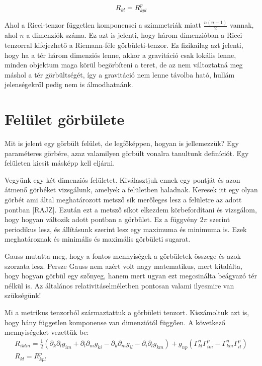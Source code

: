 \documentclass[a4paper,12pt]{article}
\begin{document}
\begin{equation*}
    R_{kl} = R_{kpl}^{p}
\end{equation*}
\par Ahol a Ricci-tenzor független komponensei a szimmetriák miatt $\frac{n(n+1)}{2}$ vannak, ahol $n$ a dimenziók száma. Ez azt is jelenti, hogy három dimenzióban a Ricci-tenzorral kifejezhető a Riemann-féle görbületi-tenzor. Ez fizikailag azt jelenti, hogy ha a tér három dimenziós lenne, akkor a gravitáció csak lokális lenne, minden objektum maga körül begörbíteni a teret, de az nem változtatná meg máshol a tér görbültségét, így a gravitáció nem lenne távolba ható, hullám jelenségekről pedig nem is álmodhatnánk.
\section{Felület görbülete}
\par Mit is jelent egy görbült felület, de legfőképpen, hogyan is jellemezzük? Egy paraméteres görbére, azaz valamilyen görbült vonalra tanultunk definíciót. Egy felületen kicsit másképp kell eljárni. 
\par Vegyünk egy két dimenziós felületet. Kiválasztjuk ennek egy pontját és azon átmenő görbéket vizsgálunk, amelyek a felületben haladnak. Keresek itt egy olyan görbét ami által meghatározott metsző sík merőleges lesz a felületre az adott pontban [RAJZ]. Ezután ezt a metsző síkot elkezdem körbefordítani és vizsgálom, hogy hogyan változik adott pontban a görbület. Ez a függvény $2\pi$ szerint periodikus lesz, és állításunk szerint lesz egy maximuma és minimuma is. Ezek meghatároznak és minimális és maximális görbületi sugarat. 
\par Gauss mutatta meg, hogy a fontos mennyiségek a görbületek összege és azok szorzata lesz. Persze Gauss nem azért volt nagy matematikus, mert kitalálta, hogy hogyan görbül egy szőnyeg, hanem mert ugyan ezt megcsinálta beágyazó tér nélkül is. Az általános relativitáselméletben pontosan valami ilyesmire van szükségünk!
\par Mi a metrikus tenzorból származtattuk a görbületi tenzort. Kiszámoltuk azt is, hogy hány független komponense van dimenziótól függően. A következő mennyiségeket vezettük be:
\begin{gather*}
    R_{iklm} = \frac{1}{2}(\partial_{k}\partial_{l}g_{im} + \partial_{l}\partial_{m}g_{ki} - \partial_{k}\partial_{m}g_{il} - \partial_{i}\partial_{l}g_{km}) + g_{np}(\Gamma_{kl}^{n}\Gamma_{im}^{p} - \Gamma_{km}^{n}\Gamma_{il}^{p}) \\
    R_{kl} = R_{kpl}^{p}
\end{gather*}
\end{document}
